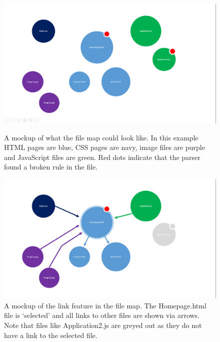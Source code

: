 \documentclass[letterpaper,10pt,titlepage,draftclsnofoot,onecolumn,onesided] {IEEEtran}
\begin{document}
\begin{figure}
\centering
\includegraphics[scale=0.25]{filemap.png}
\caption{A mockup of what the file map could look like. In this example HTML pages are blue, CSS pages are navy, image files are purple and JavaScript files are green. Red dots indicate that the parser found a broken rule in the file.}

\includegraphics[scale=0.25]{links.png}
\caption{A mockup of the link feature in the file map. The Homepage.html file is `selected' and all links to other files are shown via arrows. Note that files like Application2.js are greyed out as they do not have a link to the selected file.}

\pagebreak


\end{figure}
\end{document}
